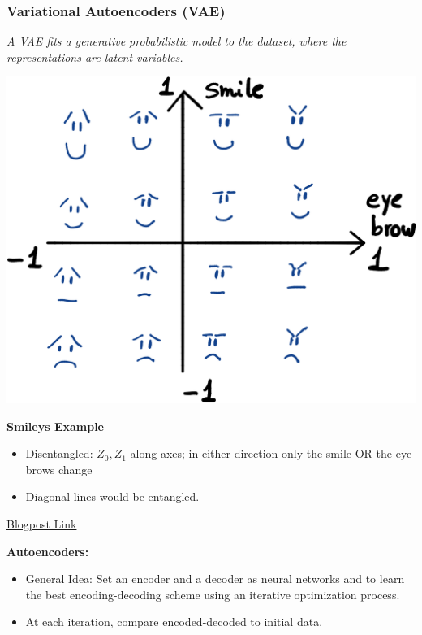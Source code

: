 \subsubsection{Variational Autoencoders (VAE)}
\textit{A VAE fits a generative probabilistic model to the dataset, where the representations are latent variables.}

\begin{minipage}{0.3\columnwidth}
	\begin{center}
		\includegraphics[width=\columnwidth]{images/11-autoencoders}
	\end{center}
\end{minipage}
\begin{minipage}{0.6\columnwidth}
\textbf{Smileys Example}
	\begin{itemize}
	\item Disentangled: $Z_0, Z_1$ along axes; in either direction only the smile OR the eye brows change
	\item Diagonal lines would be entangled.
\end{itemize}
\end{minipage}

\href{https://towardsdatascience.com/understanding-variational-autoencoders-vaes-f70510919f73}{Blogpost Link}

\textbf{Autoencoders: }
\begin{itemize}
	\item General Idea: Set an encoder and a decoder as neural networks and to learn the best encoding-decoding scheme using an iterative optimization process.
	\item At each iteration, compare encoded-decoded to initial data.
\end{itemize}



